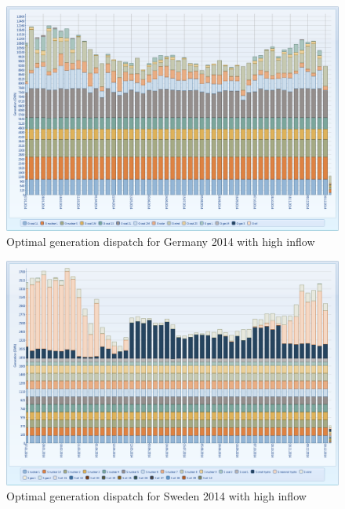 \documentclass{article}
\begin{document}
\begin{figure}[htbp]
\begin{center}
\includegraphics[width=13cm,keepaspectratio=true]{figures/wetcase/MTgenerationGwet}
\caption{Optimal generation dispatch for Germany 2014 with high inflow}
\label{fig:MTgenerationGwet}
\end{center}
\end{figure}
\begin{figure}[htbp]
\begin{center}
\includegraphics[width=13cm,keepaspectratio=true]{figures/wetcase/MTgenerationSwet}
\caption{Optimal generation dispatch for Sweden 2014 with high inflow}
\label{fig:MTgenerationSwet}
\end{center}
\end{figure}
\end{document}

